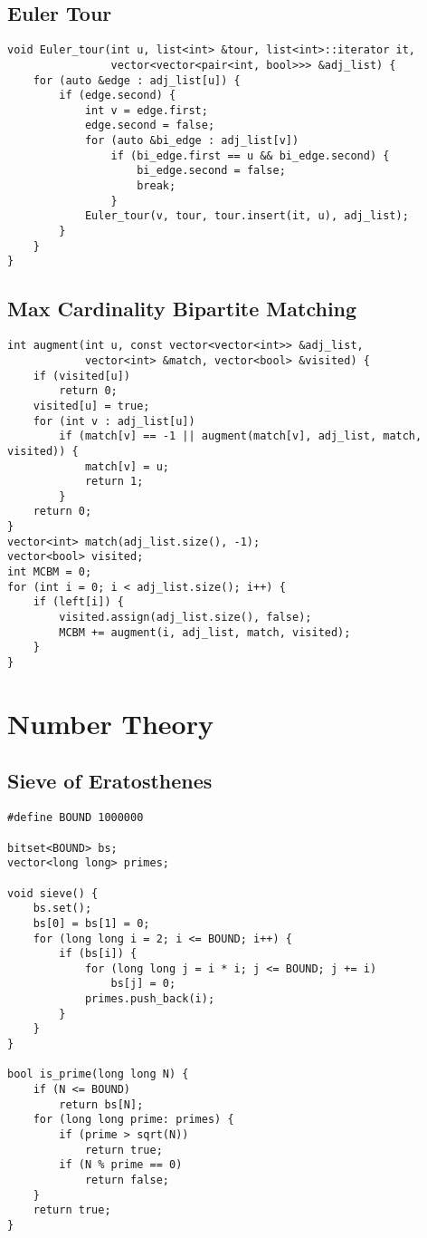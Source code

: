 \documentclass[letterpaper]{article}
\begin{document}
\subsection{Euler Tour}
\begin{lstlisting}
void Euler_tour(int u, list<int> &tour, list<int>::iterator it, 
                vector<vector<pair<int, bool>>> &adj_list) {
    for (auto &edge : adj_list[u]) {
        if (edge.second) {
            int v = edge.first;
            edge.second = false;
            for (auto &bi_edge : adj_list[v]) 
                if (bi_edge.first == u && bi_edge.second) {
                    bi_edge.second = false;
                    break;
                }
            Euler_tour(v, tour, tour.insert(it, u), adj_list);
        }
    }
}
\end{lstlisting}

\subsection{Max Cardinality Bipartite Matching}
\begin{lstlisting}
int augment(int u, const vector<vector<int>> &adj_list, 
            vector<int> &match, vector<bool> &visited) {
    if (visited[u])
        return 0;
    visited[u] = true;
    for (int v : adj_list[u])
        if (match[v] == -1 || augment(match[v], adj_list, match, visited)) {
            match[v] = u;
            return 1;
        }
    return 0;
}   
vector<int> match(adj_list.size(), -1);
vector<bool> visited;
int MCBM = 0;
for (int i = 0; i < adj_list.size(); i++) {
    if (left[i]) {
        visited.assign(adj_list.size(), false);
        MCBM += augment(i, adj_list, match, visited);
    }
}
\end{lstlisting}

\section{Number Theory}
\subsection{Sieve of Eratosthenes}
\begin{lstlisting}
#define BOUND 1000000

bitset<BOUND> bs;
vector<long long> primes;

void sieve() {
    bs.set();
    bs[0] = bs[1] = 0;
    for (long long i = 2; i <= BOUND; i++) {
        if (bs[i]) {
            for (long long j = i * i; j <= BOUND; j += i)
                bs[j] = 0;
            primes.push_back(i);
        }
    }
}

bool is_prime(long long N) {
    if (N <= BOUND)
        return bs[N];
    for (long long prime: primes) {
        if (prime > sqrt(N))
            return true;
        if (N % prime == 0)
            return false;
    }
    return true;
}
\end{lstlisting}
\newpage
\end{document}
